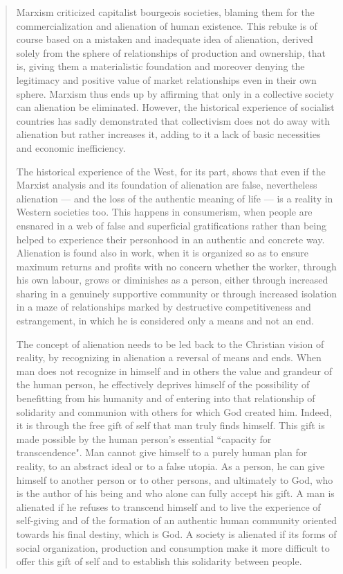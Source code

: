 \documentclass[letterpaper]{article}
\begin{document}
\begin{quote}
  Marxism criticized capitalist bourgeois societies, blaming them for the commercialization and alienation of human existence. This rebuke is of course based on a mistaken and inadequate idea of alienation, derived solely from the sphere of relationships of production and ownership, that is, giving them a materialistic foundation and moreover denying the legitimacy and positive value of market relationships even in their own sphere. Marxism thus ends up by affirming that only in a collective society can alienation be eliminated. However, the historical experience of socialist countries has sadly demonstrated that collectivism does not do away with alienation but rather increases it, adding to it a lack of basic necessities and economic inefficiency.

  The historical experience of the West, for its part, shows that even if the Marxist analysis and its foundation of alienation are false, nevertheless alienation — and the loss of the authentic meaning of life — is a reality in Western societies too. This happens in consumerism, when people are ensnared in a web of false and superficial gratifications rather than being helped to experience their personhood in an authentic and concrete way. Alienation is found also in work, when it is organized so as to ensure maximum returns and profits with no concern whether the worker, through his own labour, grows or diminishes as a person, either through increased sharing in a genuinely supportive community or through increased isolation in a maze of relationships marked by destructive competitiveness and estrangement, in which he is considered only a means and not an end.

  The concept of alienation needs to be led back to the Christian vision of reality, by recognizing in alienation a reversal of means and ends. When man does not recognize in himself and in others the value and grandeur of the human person, he effectively deprives himself of the possibility of benefitting from his humanity and of entering into that relationship of solidarity and communion with others for which God created him. Indeed, it is through the free gift of self that man truly finds himself. This gift is made possible by the human person's essential ``capacity for transcendence". Man cannot give himself to a purely human plan for reality, to an abstract ideal or to a false utopia. As a person, he can give himself to another person or to other persons, and ultimately to God, who is the author of his being and who alone can fully accept his gift. A man is alienated if he refuses to transcend himself and to live the experience of self-giving and of the formation of an authentic human community oriented towards his final destiny, which is God. A society is alienated if its forms of social organization, production and consumption make it more difficult to offer this gift of self and to establish this solidarity between people.
\end{quote}
\end{document}
